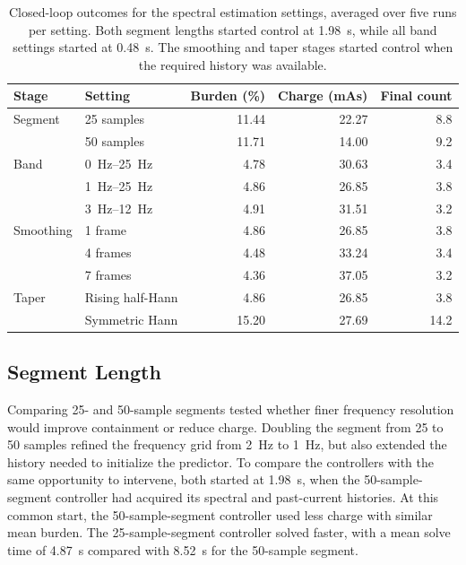 \begin{table}
  \centering
  \caption{Closed-loop outcomes for the spectral estimation settings, averaged over five runs per setting.
  Both segment lengths started control at \SI{1.98}{\second}, while all band settings started at \SI{0.48}{\second}.
  The smoothing and taper stages started control when the required history was available.}\label{tab:spectral_geometry_sweep}
  \begin{tabular}{@{}llrrr@{}}
    \toprule
    Stage & Setting & Burden (\%) & Charge (mAs) & Final count \\
    \midrule
    Segment & 25 samples & 11.44 & 22.27 & 8.8 \\
            & 50 samples & 11.71 & 14.00 & 9.2 \\
    \addlinespace
    Band & \SIrange{0}{25}{\hertz} & 4.78 & 30.63 & 3.4 \\
         & \SIrange{1}{25}{\hertz} & 4.86 & 26.85 & 3.8 \\
         & \SIrange{3}{12}{\hertz} & 4.91 & 31.51 & 3.2 \\
    \addlinespace
    Smoothing & 1 frame & 4.86 & 26.85 & 3.8 \\
              & 4 frames & 4.48 & 33.24 & 3.4 \\
              & 7 frames & 4.36 & 37.05 & 3.2 \\
    \addlinespace
    Taper & Rising half-Hann & 4.86 & 26.85 & 3.8 \\
          & Symmetric Hann & 15.20 & 27.69 & 14.2 \\
    \bottomrule
  \end{tabular}
\end{table}

\subsection{Segment Length}

Comparing 25- and 50-sample segments tested whether finer frequency resolution would improve containment or reduce charge.
Doubling the segment from 25 to 50 samples refined the frequency grid from \SI{2}{\hertz} to \SI{1}{\hertz}, but also extended the history needed to initialize the predictor.
To compare the controllers with the same opportunity to intervene, both started at \SI{1.98}{\second}, when the 50-sample-segment controller had acquired its spectral and past-current histories.
At this common start, the 50-sample-segment controller used less charge with similar mean burden.
The 25-sample-segment controller solved faster, with a mean solve time of \SI{4.87}{\second} compared with \SI{8.52}{\second} for the 50-sample segment.

